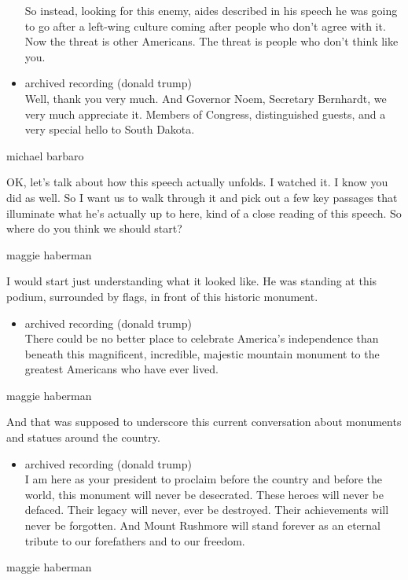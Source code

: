 \begin{itemize}
  So instead, looking for this enemy, aides described in his speech he
  was going to go after a left-wing culture coming after people who
  don't agree with it. Now the threat is other Americans. The threat is
  people who don't think like you.
\item
  archived recording (donald trump)\\
  Well, thank you very much. And Governor Noem, Secretary Bernhardt, we
  very much appreciate it. Members of Congress, distinguished guests,
  and a very special hello to South Dakota.
\end{itemize}

michael barbaro

OK, let's talk about how this speech actually unfolds. I watched it. I
know you did as well. So I want us to walk through it and pick out a few
key passages that illuminate what he's actually up to here, kind of a
close reading of this speech. So where do you think we should start?

maggie haberman

I would start just understanding what it looked like. He was standing at
this podium, surrounded by flags, in front of this historic monument.

\begin{itemize}
\tightlist
\item
  archived recording (donald trump)\\
  There could be no better place to celebrate America's independence
  than beneath this magnificent, incredible, majestic mountain monument
  to the greatest Americans who have ever lived.
\end{itemize}

maggie haberman

And that was supposed to underscore this current conversation about
monuments and statues around the country.

\begin{itemize}
\tightlist
\item
  archived recording (donald trump)\\
  I am here as your president to proclaim before the country and before
  the world, this monument will never be desecrated. These heroes will
  never be defaced. Their legacy will never, ever be destroyed. Their
  achievements will never be forgotten. And Mount Rushmore will stand
  forever as an eternal tribute to our forefathers and to our freedom.
\end{itemize}

maggie haberman

